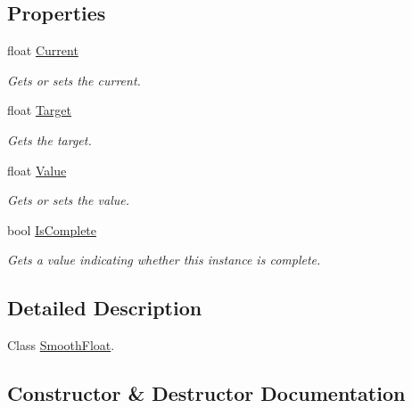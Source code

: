 \subsection*{Properties}
\begin{DoxyCompactItemize}
\item 
float \hyperlink{class_radical_library_1_1_smooth_float_ae7f201544e383a9e177ddcc0fb17c26f}{Current}
\begin{DoxyCompactList}\small\item\em Gets or sets the current. \end{DoxyCompactList}\item 
float \hyperlink{class_radical_library_1_1_smooth_float_a0a98318b672e8dca7f2f0c8aa9c08dcd}{Target}
\begin{DoxyCompactList}\small\item\em Gets the target. \end{DoxyCompactList}\item 
float \hyperlink{class_radical_library_1_1_smooth_float_a25c40f1975f462233331f9e767684ea1}{Value}
\begin{DoxyCompactList}\small\item\em Gets or sets the value. \end{DoxyCompactList}\item 
bool \hyperlink{class_radical_library_1_1_smooth_float_a4133452b12ffebb59261bc32fdbf8b9f}{Is\+Complete}
\begin{DoxyCompactList}\small\item\em Gets a value indicating whether this instance is complete. \end{DoxyCompactList}\end{DoxyCompactItemize}


\subsection{Detailed Description}
Class \hyperlink{class_radical_library_1_1_smooth_float}{Smooth\+Float}. 



\subsection{Constructor \& Destructor Documentation}
\mbox{\label{class_radical_library_1_1_smooth_float_ac0bbfcb1d44ca2dad37f574156f4075e}} 
